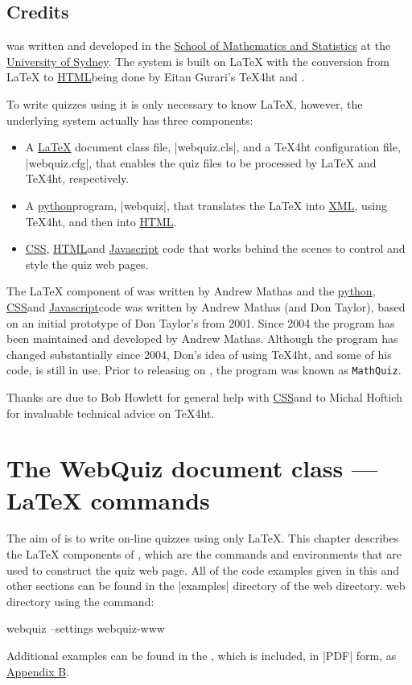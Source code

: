 \documentclass[svgnames]{article}
\newcommand\Ctan{\ctan[]{ctan}}
\newcommand{\HTML}{\href{https://www.w3schools.com/html/html_intro.asp}{HTML}}
\newcommand\CSS{\href{https://www.w3schools.com/css}{CSS}}
\newcommand\XML{\href{https://www.w3schools.com/xml/xml_whatis.asp}{XML}}
\newcommand\Javascript{\href{https://www.w3schools.com/Js/}{Javascript}}
\newcommand\python[1][python]{\href{https://www.python.org/}{#1}}
\begin{document}
\subsection{Credits}
    \WebQuiz{} was written and developed in the
    \href{http://www.maths.usyd.edu.au/}{School of Mathematics and
    Statistics} at the \href{http://www.usyd.edu.au/}{University of
    Sydney}.  The system is built on \LaTeX{} with the conversion from
    \LaTeX{} to \HTML being done by Eitan Gurari's
    \TeX4ht and .

    To write quizzes using \WebQuiz it is only necessary to know
    \LaTeX, however, the underlying \WebQuiz system actually has three
    components:
    \begin{itemize}
      \item A \href{https://www.latex-project.org/}{\LaTeX} document class
      file, \BashCode|webquiz.cls|, and a \TeX4ht
      configuration file, \BashCode|webquiz.cfg|, that enables the
      quiz files to be processed by \LaTeX{} and \TeX4ht, respectively.
      \item A \python program,
      \BashCode|webquiz|, that translates the
      \LaTeX{} into \XML, using \TeX 4ht, and then into \HTML.
      \item \CSS, \HTML and \Javascript
      code that works behind the scenes to control and style the quiz
      web pages.
    \end{itemize}

   The \LaTeX{} component of \WebQuiz{} was written by Andrew Mathas and
   the \python, \CSS and \Javascript code was written by Andrew Mathas (and
   Don Taylor), based on an initial prototype of Don Taylor's from 2001.
   Since 2004 the program has been maintained and developed by Andrew
   Mathas. Although the program has changed substantially since 2004,
   Don's idea of using \TeX4ht, and some of his code, is still
   in use. Prior to releasing \WebQuiz on \Ctan, the program was known
   as \texttt{MathQuiz}.

   Thanks are due to Bob Howlett for general help with \CSS and to
   Michal Hoftich for invaluable technical advice on \TeX4ht.

 \section{The WebQuiz document class --- \LaTeX{} commands}
 \label{S:documentclass}

  The aim of \WebQuiz is to write on-line quizzes using only \LaTeX.
  This chapter describes the \LaTeX{} components of \WebQuiz, which are
  the commands and environments that are used to construct the quiz web
  page. All of the code examples given in this and other sections can
  be found in the \BashCode|examples| directory of the \WebQuiz web
  directory.%
  \WebQuiz web directory using the command:
  \begin{bashcode}
       webquiz --settings webquiz-www
  \end{bashcode}
  Additional examples can be found in the \OnlineManual, which is
  included, in \BashCode|PDF| form, as \hyperref[S:online]{Appendix B}.
\end{document}
